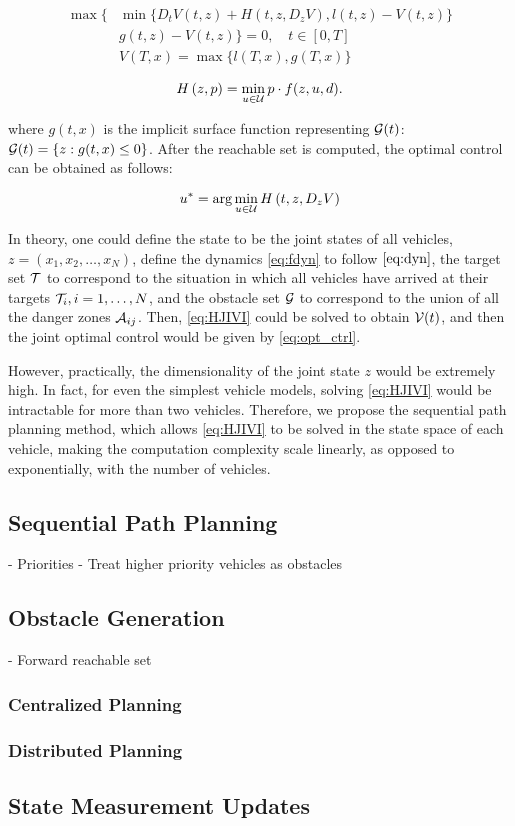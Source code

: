 \begin{equation}
\label{eq:HJIVI}
\begin{aligned}
\max\Big\{&\min\big\{D_t V(t, z) + H\left(t, z, D_z V\right), l(t,z) - V(t, z)\big\}\\
& g(t, z) - V(t, z)\Big\} = 0, \quad t\in[0,T]\\
&V(T, x) = \max\big\{l(T, x), g(T, x)\big\}
\end{aligned}
\end{equation}

\begin{equation*}
H\left(z, p\right) = \min_{u \in \mathcal{U}} p \cdot f(z, u, d).
\end{equation*}

\noindent where $g(t, x)$ is the implicit surface function representing $\mathcal{G}(t)$: $\mathcal{G}(t) = \{z: g(t, x) \le 0\}$. After the reachable set is computed, the optimal control can be obtained as follows:

\begin{equation}
\label{eq:opt_ctrl}
u^* = \arg \min_{u \in \mathcal{U}} H\left(t, z, D_z V\right)
\end{equation}

In theory, one could define the state to be the joint states of all vehicles, $z = (x_1, x_2, \ldots, x_N)$, define the dynamics \eqref{eq:fdyn} to follow $\eqref{eq:dyn}$, the target set $\mathcal{T}$ to correspond to the situation in which all vehicles have arrived at their targets $\mathcal{T}_i, i = 1, \ldots, N$, and the obstacle set $\mathcal{G}$ to correspond to the union of all the danger zones $\mathcal{A}_{ij}$. Then, \eqref{eq:HJIVI} could be solved to obtain $\mathcal{V}(t)$, and then the joint optimal control would be given by \eqref{eq:opt_ctrl}.

However, practically, the dimensionality of the joint state $z$ would be extremely high. In fact, for even the simplest vehicle models, solving \eqref{eq:HJIVI} would be intractable for more than two vehicles. Therefore, we propose the sequential path planning method, which allows \eqref{eq:HJIVI} to be solved in the state space of each vehicle, making the computation complexity scale linearly, as opposed to exponentially, with the number of vehicles.

\subsection{Sequential Path Planning}
- Priorities
- Treat higher priority vehicles as obstacles
\subsection{Obstacle Generation}
- Forward reachable set
\subsubsection{Centralized Planning}
\subsubsection{Distributed Planning}

\subsection{State Measurement Updates}